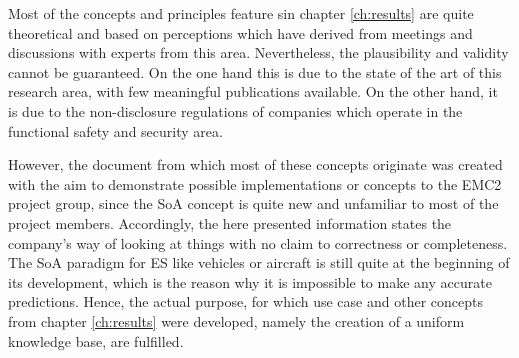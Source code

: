 Most of the concepts and principles feature sin chapter \ref{ch:results} are quite theoretical and based on perceptions which have derived from meetings and discussions with experts from this area. Nevertheless, the plausibility and validity cannot be guaranteed. On the one hand this is due to the state of the art of this research area, with few meaningful publications available. On the other hand, it is due to the non-disclosure regulations of companies which operate in the functional safety and security area.

However, the document from which most of these concepts originate was created with the aim to demonstrate possible implementations or concepts to the EMC2 project group, since the SoA concept is quite new and unfamiliar to most of the project members. Accordingly, the here presented information states the company's way of looking at things with no claim to correctness or completeness. The SoA paradigm for ES like vehicles or aircraft is still quite at the beginning of its development, which is the reason why it is impossible to make any accurate predictions. Hence, the actual purpose, for which use case and other concepts from chapter \ref{ch:results} were developed, namely the creation of a uniform knowledge base, are fulfilled.